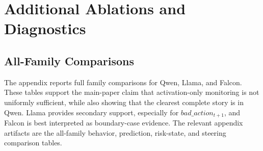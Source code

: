 \documentclass{article}
\theoremstyle{plain}
\theoremstyle{definition}
\theoremstyle{remark}
\begin{document}
\section{Additional Ablations and Diagnostics}
\label{sec:appendix}


\subsection{All-Family Comparisons}

The appendix reports full family comparisons for Qwen, Llama, and Falcon. These tables support the main-paper claim that activation-only monitoring is not uniformly sufficient, while also showing that the clearest complete story is in Qwen. Llama provides secondary support, especially for \(bad\_action_{t+1}\), and Falcon is best interpreted as boundary-case evidence. The relevant appendix artifacts are the all-family behavior, prediction, risk-state, and steering comparison tables.
\end{document}
